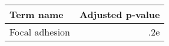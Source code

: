 \begin{tabular}{lr}
\toprule
     Term name &  Adjusted p-value \\
\midrule
Focal adhesion &               .2e \\
\bottomrule
\end{tabular}
